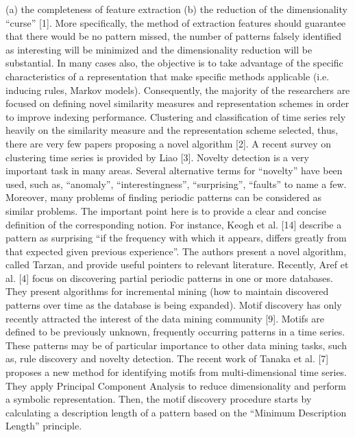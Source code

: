 \documentclass[12pt]{report}
\begin{document}
(a) the completeness of feature extraction 
(b) the reduction of the dimensionality “curse” [1]. 
More specifically, the method of extraction features should guarantee that there would be no pattern missed, the number of patterns falsely identified as interesting will be minimized and the dimensionality reduction will be substantial. In many cases also, the objective is to take advantage of the specific characteristics of a representation that make specific methods applicable (i.e. inducing rules, Markov models). Consequently, the majority of the researchers are focused on defining novel similarity measures and representation schemes in order to improve indexing performance. 
Clustering and classification of time series rely heavily on the similarity measure and the representation scheme selected, thus, there are very few papers proposing a novel algorithm [2]. A recent survey on clustering time series is provided by Liao [3].  
Novelty detection is a very important task in many areas. Several alternative terms for “novelty” have been used, such as, “anomaly”, “interestingness”, “surprising”, “faults” to name a few. Moreover, many problems of finding periodic patterns can be considered as similar problems. The important point here is to provide a clear and concise definition of the corresponding notion. For instance, Keogh et al. [14] describe a pattern as surprising “if the frequency with which it appears, differs greatly from that expected given previous experience”. The authors present a novel algorithm, called Tarzan, and provide useful pointers to relevant literature. Recently, Aref et al. [4] focus on discovering partial periodic patterns in one or more databases. They present algorithms for incremental mining (how to maintain discovered patterns over time as the database is being expanded).
Motif discovery has only recently attracted the interest of the data mining community [9]. Motifs are defined to be previously unknown, frequently occurring patterns in a time series. These patterns may be of particular importance to other data mining tasks, such as, rule discovery and novelty detection. The recent work of Tanaka et al. [7] proposes a new method for identifying motifs from multi-dimensional time series. They apply Principal Component Analysis to reduce dimensionality and perform a symbolic representation. Then, the motif discovery procedure starts by calculating a description length of a pattern based on the “Minimum Description Length” principle.
\end{document}
